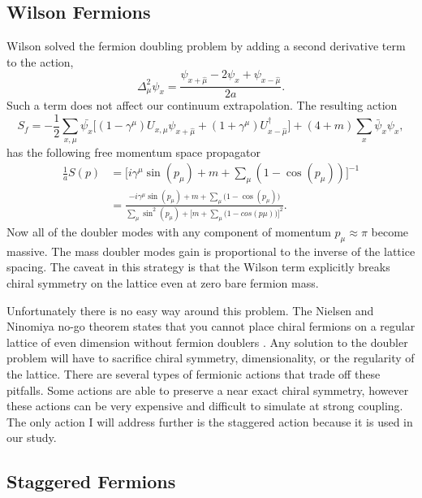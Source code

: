 \subsection{Wilson Fermions}
Wilson solved the fermion doubling problem by adding a second derivative term to the action,
\begin{equation}
  \Delta_\mu^2\psi_x=\frac{\psi_{x+\hat{\mu}}-2\psi_x+\psi_{x-\hat{\mu}}}{2a}.
\end{equation}
Such a term does not affect our continuum extrapolation.
The resulting action
\begin{equation}
  S_f=-\frac{1}{2}\sum_{x,\mu}\bar{\psi_x}\Big[(1-\gamma^\mu)U_{x,\mu}\psi_{x+\hat{\mu}}+(1+\gamma^\mu)U^\dagger_{x-\hat{\mu}}\Big]+(4+m)\sum_x\bar{\psi}_x\psi_x,
\end{equation}
has the following free momentum space propagator
\begin{equation}
  \begin{aligned}
    \frac{1}{a}S(p)&=\Big[i\gamma^\mu\sin(p_\mu)+m+\sum_\mu(1-\cos(p_\mu))\Big]^{-1}  \\
                   &=\frac{-i\gamma^\mu\sin(p_\mu)+m+\sum_\mu\big(1-\cos(p_\mu)\big)}{\sum_\mu\sin^2(p_\mu)+\Big[m+\sum_\mu\big(1-cos(p\mu)\big)\Big]^2}.
  \end{aligned}
\end{equation}
Now all of the doubler modes with any component of momentum $p_\mu\approx\pi$ become massive.
The mass doubler modes gain is proportional to the inverse of the lattice spacing.
The caveat in this strategy is that the Wilson term explicitly breaks chiral symmetry on the lattice even at zero bare fermion mass.

Unfortunately there is no easy way around this problem.
The Nielsen and Ninomiya no-go theorem states that you cannot place chiral fermions on a regular lattice of even dimension without fermion doublers \cite{Nielsen198120,Nielsen1981173,Nielsen1981219,kaplan:fermions}.
Any solution to the doubler problem will have to sacrifice chiral symmetry, dimensionality, or the regularity of the lattice.
There are several types of fermionic actions that trade off these pitfalls.
Some actions are able to preserve a near exact chiral symmetry, however these actions can be very expensive and difficult to simulate at strong coupling.
The only action I will address further is the staggered action because it is used in our study.

\subsection{Staggered Fermions}

